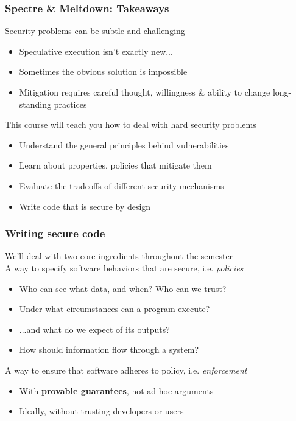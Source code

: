 \documentclass[10pt]{beamer}
\begin{document}

\begin{frame}

\frametitle{Spectre \& Meltdown: Takeaways}

Security problems can be subtle and challenging
\begin{itemize}
  \item Speculative execution isn't exactly new...
  \pause\item Sometimes the obvious solution is impossible
  \pause\item Mitigation requires careful thought, willingness \& ability to change long-standing practices \\[2em]
\end{itemize}

\pause
This course will teach you how to deal with hard security problems
\begin{itemize}
  \item Understand the general principles behind vulnerabilities
  \item Learn about properties, policies that mitigate them
  \item Evaluate the tradeoffs of different security mechanisms
  \item Write code that is secure by design
\end{itemize}

\end{frame}








\begin{frame}

\frametitle{Writing secure code}

We'll deal with two core ingredients throughout the semester
\\[1em]

\pause
A way to specify software behaviors that are secure, i.e. \emph{policies} \pause
\begin{itemize}
  \item Who can see what data, and when? Who can we trust?
  \item Under what circumstances can a program execute?
  \item ...and what do we expect of its outputs?
  \item How should information flow through a system? \\[1em]
\end{itemize}

\pause
A way to ensure that software adheres to policy, i.e. \emph{enforcement} \pause
\begin{itemize}
  \item With \textbf{provable guarantees}, not ad-hoc arguments
  \item Ideally, without trusting developers or users
\end{itemize}

\end{frame}
\end{document}
